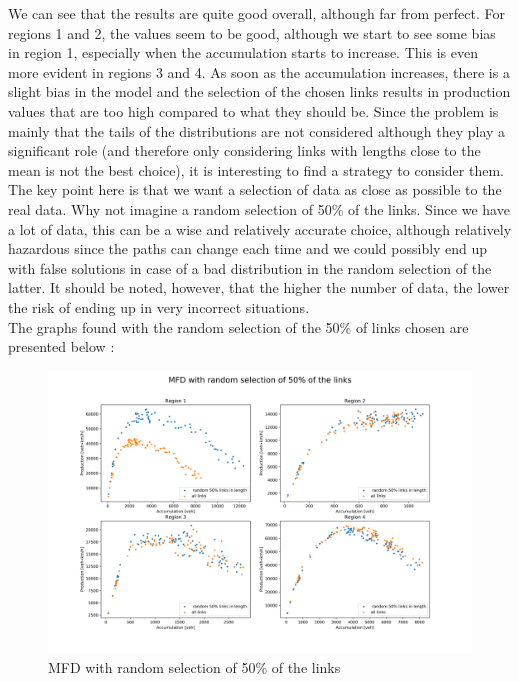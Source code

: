 \documentclass[a4paper, 12pt,oneside]{article}
\begin{document}
\bigbreak

We can see that the results are quite good overall, although far from perfect. For regions 1 and 2, the values seem to be good, although we start to see some bias in region 1, especially when the accumulation starts to increase. This is even more evident in regions 3 and 4. As soon as the accumulation increases, there is a slight bias in the model and the selection of the chosen links results in production values that are too high compared to what they should be.
\smallbreak
Since the problem is mainly that the tails of the distributions are not considered although they play a significant role (and therefore only considering links with lengths close to the mean is not the best choice), it is interesting to find a strategy to consider them. The key point here is that we want a selection of data as close as possible to the real data. Why not imagine a random selection of 50\% of the links. Since we have a lot of data, this can be a wise and relatively accurate choice, although relatively hazardous since the paths can change each time and we could possibly end up with false solutions in case of a bad distribution in the random selection of the latter. It should be noted, however, that the higher the number of data, the lower the risk of ending up in very incorrect situations.\\
The graphs found with the random selection of the 50\% of links chosen are presented below :

\begin{figure}[H]
    \begin{center}
        \includegraphics[width=18cm]{Images/step6_random.png}
        \caption{MFD with random selection of 50\% of the links}
        \label{MFD with random selection of 50\% of the links}
    \end{center}
\end{figure}
\end{document}
